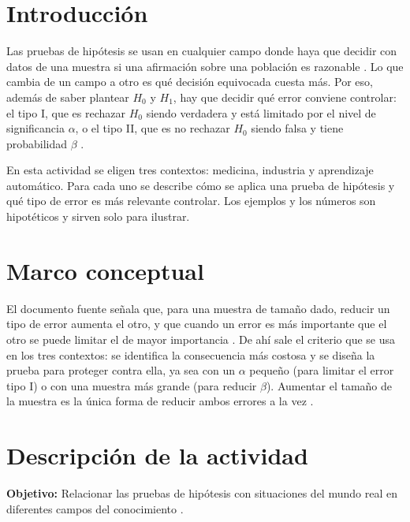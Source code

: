 \documentclass[11pt,letterpaper]{article}
\begin{document}
\portada
\indicegeneral


\section{Introducción}

Las pruebas de hipótesis se usan en cualquier campo donde haya que decidir con datos de una muestra si una afirmación sobre una población es razonable \parencite{tecnm2026_documento_fuente}. Lo que cambia de un campo a otro es qué decisión equivocada cuesta más. Por eso, además de saber plantear $H_0$ y $H_1$, hay que decidir qué error conviene controlar: el tipo I, que es rechazar $H_0$ siendo verdadera y está limitado por el nivel de significancia $\alpha$, o el tipo II, que es no rechazar $H_0$ siendo falsa y tiene probabilidad $\beta$ \parencite{tecnm2026_documento_fuente}.

En esta actividad se eligen tres contextos: medicina, industria y aprendizaje automático. Para cada uno se describe cómo se aplica una prueba de hipótesis y qué tipo de error es más relevante controlar. Los ejemplos y los números son hipotéticos y sirven solo para ilustrar.

\section{Marco conceptual}

El documento fuente señala que, para una muestra de tamaño dado, reducir un tipo de error aumenta el otro, y que cuando un error es más importante que el otro se puede limitar el de mayor importancia \parencite{tecnm2026_documento_fuente}. De ahí sale el criterio que se usa en los tres contextos: se identifica la consecuencia más costosa y se diseña la prueba para proteger contra ella, ya sea con un $\alpha$ pequeño (para limitar el error tipo I) o con una muestra más grande (para reducir $\beta$). Aumentar el tamaño de la muestra es la única forma de reducir ambos errores a la vez \parencite{tecnm2026_documento_fuente}.

\section{Descripción de la actividad}

\textbf{Objetivo:} Relacionar las pruebas de hipótesis con situaciones del mundo real en diferentes campos del conocimiento \parencite{tecnm2026_documento_fuente}.
\end{document}
